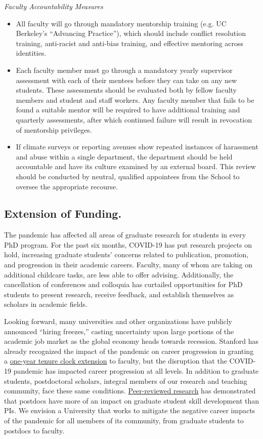 \documentclass[12pt, titlepage, letterpaper]{article}
\begin{document}
\textit{Faculty Accountability Measures}
\begin{itemize}
    \item All faculty will go through mandatory mentorship training (e.g. UC Berkeley’s “Advancing Practice”), which should include conflict resolution training, anti-racist and anti-bias training, and effective mentoring across identities.
    \item Each faculty member must go through a mandatory yearly supervisor assessment with each of their mentees before they can take on any new students. These assessments should be evaluated both by fellow faculty members and student and staff workers. Any faculty member that fails to be found a suitable mentor will be required to have additional training and quarterly assessments, after which continued failure will result in revocation of mentorship privileges. 
    \item If climate surveys or reporting avenues show repeated instances of harassment and abuse within a single department, the department should be held accountable and have its culture examined by an external board. This review should be conducted by neutral, qualified appointees from the School to oversee the appropriate recourse.
\end{itemize}

\subsection*{Extension of Funding.}
%


The pandemic has affected all areas of graduate research for students in every PhD program. For the past six months, COVID-19 has put research projects on hold, increasing graduate students’ concerns related to publication, promotion, and progression in their academic careers. Faculty, many of whom are taking on additional childcare tasks, are less able to offer advising. Additionally, the cancellation of conferences and colloquia has curtailed opportunities for PhD students to present research, receive feedback, and establish themselves as scholars in academic fields. 

Looking forward, many universities and other organizations have publicly announced “hiring freezes,” casting uncertainty upon large portions of the academic job market as the global economy heads towards recession. Stanford has already recognized the impact of the pandemic on career progression in granting a \href{https://facultyhandbook.stanford.edu/covid-19-health-emergency-tenure-clock-extension}{one-year tenure clock extension} to faculty, but the disruption that the COVID-19 pandemic has impacted career progression at all levels. In addition to graduate students, postdoctoral scholars, integral members of our research and teaching community, face these same conditions. \href{https://www.pnas.org/content/116/42/20910}{Peer-reviewed research} has demonstrated that postdocs have more of an impact on graduate student skill development than PIs. We envision a University that works to mitigate the negative career impacts of the pandemic for all members of its community, from graduate students to postdocs to faculty. 
\end{document}
